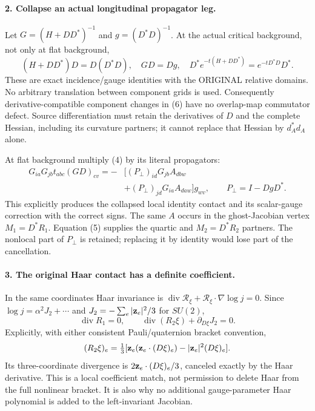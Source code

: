 \documentclass[11pt]{article}
\begin{document}
\paragraph{2. Collapse an actual longitudinal propagator leg.}
Let $G=(H+DD^*)^{-1}$ and $g=(D^*D)^{-1}$.
At the actual critical background, not only at flat background,
\[
 (H+DD^*)D=D(D^*D),\quad GD=Dg,\quad
 D^*e^{-t(H+DD^*)}=e^{-tD^*D}D^*.                                \tag{6}
\]
These are exact incidence/gauge identities with the ORIGINAL relative
domains. No arbitrary translation between component grids is used.
Consequently derivative-compatible component changes in (6) have no
overlap-map commutator defect. Source differentiation must retain the
derivatives of $D$ and the complete Hessian, including its curvature
partners; it cannot replace that Hessian by $d_A^*d_A$ alone.

At flat background multiply (4) by its literal propagators:
\[
 \begin{split}
 G_{ia}G_{jb}t_{abc}(GD)_{cv}
 =-&\big[(P_\perp)_{id}G_{jb}A_{dbw}\\
       &+(P_\perp)_{jd}G_{ia}A_{daw}\big]g_{wv},\qquad
 P_\perp=I-DgD^* .                                               \end{split}\tag{7}
\]
This explicitly produces the collapsed local identity contact and its
scalar-gauge correction with the correct signs. The same $A$ occurs
in the ghost-Jacobian vertex $M_1=D^*R_1$.
Equation (5) supplies the quartic and $M_2=D^*R_2$ partners.
The nonlocal part of $P_\perp$ is retained; replacing it by identity
would lose part of the cancellation.

\paragraph{3. The original Haar contact has a definite coefficient.}
In the same coordinates Haar invariance is
$\operatorname{div}\mathcal R_\xi+
 \mathcal R_\xi\cdot\nabla\log j=0$.
Since $\log j=\alpha^2J_2+\cdots$ and
$J_2=-\sum_e|{\bf z}_e|^2/3$ for $SU(2)$,
\[
 \operatorname{div}R_1=0,\qquad
 \boxed{\operatorname{div}(R_2\xi)+
                    \partial_{D\xi}J_2=0.}                      \tag{8}
\]
Explicitly, with either consistent Pauli/quaternion bracket convention,
\[
 (R_2\xi)_e=\tfrac13[{\bf z}_e({\bf z}_e\cdot(D\xi)_e)
                         -|{\bf z}_e|^2(D\xi)_e].
\]
Its three-coordinate divergence is
$2{\bf z}_e\cdot(D\xi)_e/3$, canceled exactly by the Haar derivative.
This is a local coefficient match, not permission to delete Haar from
the full nonlinear bracket. It is also why no additional gauge-parameter
Haar polynomial is added to the left-invariant Jacobian.
\end{document}
